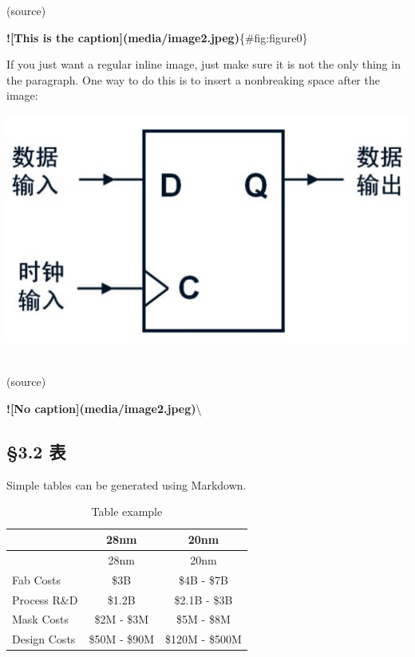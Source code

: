 \documentclass[]{article}
\newenvironment{Shaded}{}{}
\newcommand{\AlertTok}[1]{\textcolor[rgb]{1.00,0.00,0.00}{\textbf{#1}}}
\newcommand{\NormalTok}[1]{#1}
\begin{document}
(source)

\begin{Shaded}
\begin{Highlighting}[]
\AlertTok{![This is the caption](media/image2.jpeg)}\NormalTok{\{#fig:figure0\}}
\end{Highlighting}
\end{Shaded}

If you just want a regular inline image, just make sure it is not the
only thing in the paragraph. One way to do this is to insert a
nonbreaking space after the image:

\includegraphics{media/image2.jpeg}~

(source)

\begin{Shaded}
\begin{Highlighting}[]
\AlertTok{![No caption](media/image2.jpeg)}\NormalTok{\textbackslash{} }
\end{Highlighting}
\end{Shaded}

\hypertarget{sec:ux8868}{%
\subsection{§3.2 表}\label{sec:ux8868}}

Simple tables can be generated using Markdown.

\hypertarget{tbl:table1}{}
\begin{longtable}[]{@{}lcc@{}}
\caption{\label{tbl:table1}Table example }\tabularnewline
\toprule
& 28nm & 20nm\tabularnewline
\midrule
\endfirsthead
\toprule
& 28nm & 20nm\tabularnewline
\midrule
\endhead
Fab Costs & \$3B & \$4B - \$7B\tabularnewline
Process R\&D & \$1.2B & \$2.1B - \$3B\tabularnewline
Mask Costs & \$2M - \$3M & \$5M - \$8M\tabularnewline
Design Costs & \$50M - \$90M & \$120M - \$500M\tabularnewline
\bottomrule
\end{longtable}
\end{document}
